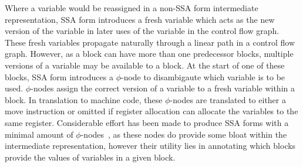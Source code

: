 Where a variable would be reassigned in a non-SSA form intermediate representation, SSA form introduces a fresh variable which acts as the new version of the variable in later uses of the variable in the control flow graph. These fresh variables propagate naturally through a linear path in a control flow graph. However, as a block can have more than one predecessor blocks, multiple versions of a variable may be available to a block. At the start of one of these blocks, SSA form introduces a $\phi$-node to disambigaute which variable is to be used. $\phi$-nodes assign the correct version of a variable to a fresh variable within a block. In translation to machine code, these $\phi$-nodes are translated to either a move instruction or omitted if register allocation can allocate the variables to the same register. Considerable effort has been made to produce SSA forms with a minimal amount of $\phi$-nodes~\cite{cooper2001simple, braun2013simple}, as these nodes do provide some bloat within the intermediate representation, however their utility lies in annotating which blocks provide the values of variables in a given block.

